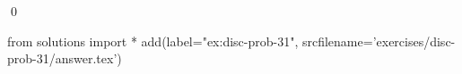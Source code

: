 
\begin{ex} 
  \label{ex:disc-prob-31}
  
  \qed
\end{ex} 
\begin{python0}
from solutions import *
add(label="ex:disc-prob-31",
    srcfilename='exercises/disc-prob-31/answer.tex') 
\end{python0}
